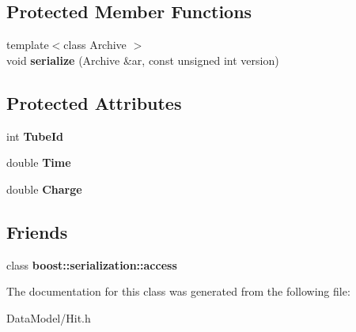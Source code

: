 \subsection*{Protected Member Functions}
\begin{DoxyCompactItemize}
\item 
\hypertarget{classHit_af3bafb22cc7c2c224af22927c6ea2d07}{{\footnotesize template$<$class Archive $>$ }\\void {\bfseries serialize} (Archive \&ar, const unsigned int version)}\label{classHit_af3bafb22cc7c2c224af22927c6ea2d07}

\end{DoxyCompactItemize}
\subsection*{Protected Attributes}
\begin{DoxyCompactItemize}
\item 
\hypertarget{classHit_a442f7a2eebdfbc0e8c29194f4e26e40e}{int {\bfseries Tube\-Id}}\label{classHit_a442f7a2eebdfbc0e8c29194f4e26e40e}

\item 
\hypertarget{classHit_a8abba0e32e50c99ed70f38f660486e29}{double {\bfseries Time}}\label{classHit_a8abba0e32e50c99ed70f38f660486e29}

\item 
\hypertarget{classHit_a6460be8aae8df3d04ae3871d99bf0193}{double {\bfseries Charge}}\label{classHit_a6460be8aae8df3d04ae3871d99bf0193}

\end{DoxyCompactItemize}
\subsection*{Friends}
\begin{DoxyCompactItemize}
\item 
\hypertarget{classHit_ac98d07dd8f7b70e16ccb9a01abf56b9c}{class {\bfseries boost\-::serialization\-::access}}\label{classHit_ac98d07dd8f7b70e16ccb9a01abf56b9c}

\end{DoxyCompactItemize}


The documentation for this class was generated from the following file\-:\begin{DoxyCompactItemize}
\item 
Data\-Model/Hit.\-h\end{DoxyCompactItemize}
